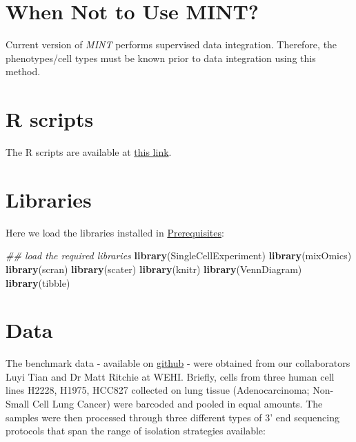 \documentclass[]{book}
\newenvironment{Shaded}{\begin{snugshade}}{\end{snugshade}}
\newcommand{\CommentTok}[1]{\textcolor[rgb]{0.56,0.35,0.01}{\textit{#1}}}
\newcommand{\KeywordTok}[1]{\textcolor[rgb]{0.13,0.29,0.53}{\textbf{#1}}}
\newcommand{\NormalTok}[1]{#1}
\theoremstyle{definition}
\theoremstyle{definition}
\theoremstyle{definition}
\theoremstyle{remark}
\begin{document}
\hypertarget{when-not-to-use-mint}{%
\section{When Not to Use MINT?}\label{when-not-to-use-mint}}

Current version of \emph{MINT} performs supervised data integration.
Therefore, the phenotypes/cell types must be known prior to data
integration using this method.

\hypertarget{r-scripts}{%
\section{R scripts}\label{r-scripts}}

The R scripts are available at
\href{https://github.com/AJABADI/MINT_sPLSDA/blob/master/01-Data-Integration.R}{this
link}.

\hypertarget{libraries}{%
\section{Libraries}\label{libraries}}

Here we load the libraries installed in
\protect\hyperlink{prerequisites}{Prerequisites}:

\begin{Shaded}
\begin{Highlighting}[]
\CommentTok{## load the required libraries}
\KeywordTok{library}\NormalTok{(SingleCellExperiment)}
\KeywordTok{library}\NormalTok{(mixOmics)}
\KeywordTok{library}\NormalTok{(scran)}
\KeywordTok{library}\NormalTok{(scater)}
\KeywordTok{library}\NormalTok{(knitr)}
\KeywordTok{library}\NormalTok{(VennDiagram)}
\KeywordTok{library}\NormalTok{(tibble)}
\end{Highlighting}
\end{Shaded}

\hypertarget{data}{%
\section{Data}\label{data}}

The benchmark data - available on
\href{https://github.com/LuyiTian/CellBench_data}{github} - were
obtained from our collaborators Luyi Tian and Dr Matt Ritchie at WEHI.
Briefly, cells from three human cell lines H2228, H1975, HCC827
collected on lung tissue (Adenocarcinoma; Non-Small Cell Lung Cancer)
were barcoded and pooled in equal amounts. The samples were then
processed through three different types of 3' end sequencing protocols
that span the range of isolation strategies available:
\end{document}
